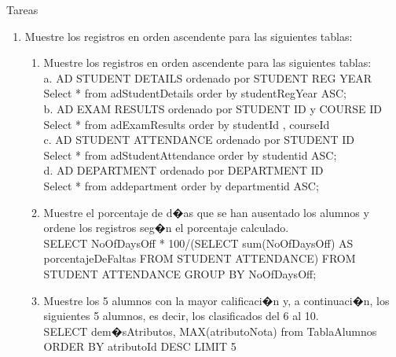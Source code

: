 \documentclass[12pt,letterpaper]{article}
\begin{document}
Tareas\\
\begin{enumerate}[1.]
    \item Muestre los registros en orden ascendente para las siguientes tablas:\\

\begin{enumerate}
	\item	Muestre los registros en orden ascendente para las siguientes tablas:\\

		a.	AD STUDENT DETAILS ordenado por STUDENT REG YEAR\\ 
		
			Select * from adStudentDetails order by studentRegYear ASC;\\	
			
		b.	AD EXAM RESULTS ordenado por STUDENT ID y COURSE ID\\ 
		
			Select * from adExamResults order by studentId , courseId\\
					
		c.	AD STUDENT ATTENDANCE ordenado por STUDENT ID\\ 

			Select * from adStudentAttendance order by studentid ASC;\\
		
		d.	AD DEPARTMENT ordenado por DEPARTMENT ID\\

			Select * from addepartment order by  departmentid  ASC;\\
 
	\item	Muestre el porcentaje de d�as que se han ausentado los alumnos y ordene los registros seg�n el porcentaje calculado.\\
	
		SELECT NoOfDaysOff * 100/(SELECT sum(NoOfDaysOff) AS porcentajeDeFaltas FROM STUDENT ATTENDANCE) 
		FROM STUDENT ATTENDANCE GROUP BY NoOfDaysOff;\\
 
	\item	Muestre los 5 alumnos con la mayor calificaci�n y, a continuaci�n, los siguientes 5 alumnos, es decir,  los clasificados del 6 		al 10.\\

		SELECT dem�sAtributos, MAX(atributoNota) from TablaAlumnos ORDER BY atributoId DESC LIMIT 5 \\
 

\end{enumerate}
\end{enumerate}
\end{document}
